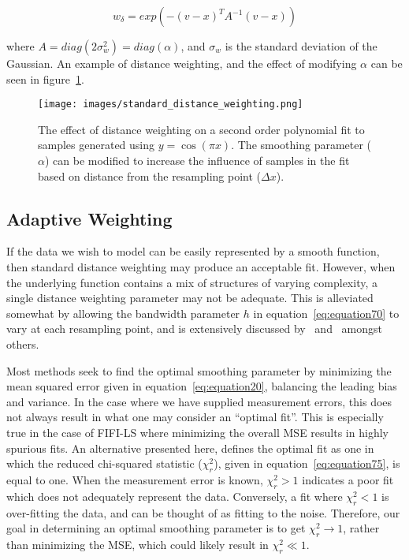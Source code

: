 \begin{equation}
    w_{\delta} = exp \left(-(v - x)^T A^{-1} (v - x) \right)
    \label{eq:equation77}
\end{equation}

where $A = diag(2 \sigma_w^2) = diag(\alpha)$, and $\sigma_w$ is the standard
deviation of the Gaussian.
An example of distance weighting, and the effect of modifying $\alpha$ can be
seen in figure~\ref{fig:standard-distance-weighting}.

\begin{figure}[H]
  \begin{center}
  \texttt{[image: images/standard\_distance\_weighting.png]}
  \caption{The effect of distance weighting on a second order polynomial fit to
           samples generated using $y=\cos(\pi x)$.  The smoothing parameter
           ($\alpha$) can be modified to increase the influence of samples in
           the fit based on distance from the resampling point ($\Delta x$).}
  \label{fig:standard-distance-weighting}
  \end{center}
\end{figure}

\subsection{Adaptive Weighting}\label{subsec:adaptive-weighting}

If the data we wish to model can be easily represented by a smooth function,
then standard distance weighting may produce an acceptable fit.
However, when the underlying function contains a mix of structures of
varying complexity, a single distance weighting parameter may not be adequate.
This is alleviated somewhat by allowing the bandwidth parameter $h$ in
equation~\ref{eq:equation70} to vary at each resampling point, and is
extensively discussed by~\citet{Fan96b} and~\citet{Masry1996} amongst others.

Most methods seek to find the optimal smoothing parameter by minimizing
the mean squared error given in equation~\ref{eq:equation20}, balancing
the leading bias and variance.
In the case where we have supplied measurement errors, this does not always
result in what one may consider an ``optimal fit''.
This is especially true in the case of FIFI-LS where minimizing the overall
MSE results in highly spurious fits.
An alternative presented here, defines the optimal fit as one in which the
reduced chi-squared statistic ($\chi_r^2$), given in
equation~\ref{eq:equation75}, is equal to one.
When the measurement error is known, $\chi_r^2 > 1$ indicates a poor fit which
does not adequately represent the data.
Conversely, a fit where $\chi_r^2 < 1$ is over-fitting the data, and can be
thought of as fitting to the noise.
Therefore, our goal in determining an optimal smoothing parameter is to get
$\chi_r^2 \to 1$, rather than minimizing the MSE, which could likely result
in $\chi_r^2 \ll 1$.

